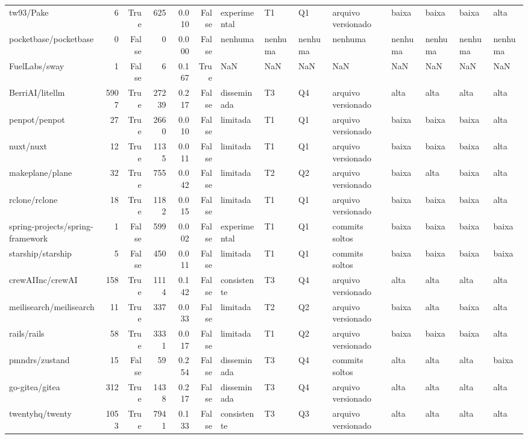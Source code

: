 \begin{tabular}{lrrrrrllllllll}
tw93/Pake & 6 & True & 625 & 0.010 & False & experimental & T1 & Q1 & arquivo versionado & baixa & baixa & baixa & alta \\
pocketbase/pocketbase & 0 & False & 0 & 0.000 & False & nenhuma & nenhuma & nenhuma & nenhuma & nenhuma & nenhuma & nenhuma & nenhuma \\
FuelLabs/sway & 1 & False & 6 & 0.167 & True & NaN & NaN & NaN & NaN & NaN & NaN & NaN & NaN \\
BerriAI/litellm & 5907 & True & 27239 & 0.217 & False & disseminada & T3 & Q4 & arquivo versionado & alta & alta & alta & alta \\
penpot/penpot & 27 & True & 2660 & 0.010 & False & limitada & T1 & Q1 & arquivo versionado & baixa & baixa & baixa & alta \\
nuxt/nuxt & 12 & True & 1135 & 0.011 & False & limitada & T1 & Q1 & arquivo versionado & baixa & baixa & baixa & alta \\
makeplane/plane & 32 & True & 755 & 0.042 & False & limitada & T2 & Q2 & arquivo versionado & baixa & alta & baixa & alta \\
rclone/rclone & 18 & True & 1182 & 0.015 & False & limitada & T1 & Q1 & arquivo versionado & baixa & baixa & baixa & alta \\
spring-projects/spring-framework & 1 & False & 599 & 0.002 & False & experimental & T1 & Q1 & commits soltos & baixa & baixa & baixa & baixa \\
starship/starship & 5 & False & 450 & 0.011 & False & limitada & T1 & Q1 & commits soltos & baixa & baixa & baixa & baixa \\
crewAIInc/crewAI & 158 & True & 1114 & 0.142 & False & consistente & T3 & Q4 & arquivo versionado & alta & alta & alta & alta \\
meilisearch/meilisearch & 11 & True & 337 & 0.033 & False & limitada & T2 & Q2 & arquivo versionado & baixa & alta & baixa & alta \\
rails/rails & 58 & True & 3331 & 0.017 & False & limitada & T1 & Q2 & arquivo versionado & baixa & baixa & baixa & alta \\
pmndrs/zustand & 15 & False & 59 & 0.254 & False & disseminada & T3 & Q4 & commits soltos & alta & alta & alta & baixa \\
go-gitea/gitea & 312 & True & 1438 & 0.217 & False & disseminada & T3 & Q4 & arquivo versionado & alta & alta & alta & alta \\
twentyhq/twenty & 1053 & True & 7941 & 0.133 & False & consistente & T3 & Q3 & arquivo versionado & alta & alta & alta & alta \\

\end{tabular}
